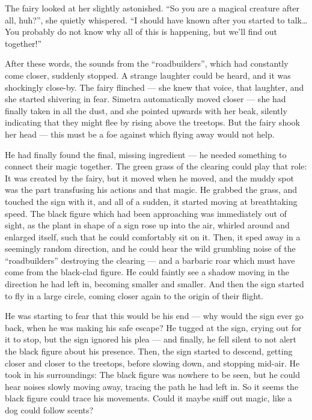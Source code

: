 The fairy looked at her slightly astonished. \enquote{So you are a magical creature after all, huh?}, she quietly whispered. \enquote{I should have known after you started to talk\dots{} You probably do not know why all of this is happening, but we'll find out together!}

After these words, the sounds from the \enquote{roadbuilders}, which had constantly come closer, suddenly stopped. A strange laughter could be heard, and it was shockingly close-by. The fairy flinched --- she knew that voice, that laughter, and she started shivering in fear. Simetra automatically moved closer --- she had finally taken in all the dust, and she pointed upwards with her beak, silently indicating that they might flee by rising above the treetops. But the fairy shook her head --- this must be a foe against which flying away would not help.

\froufrou{}

He had finally found the final, missing ingredient --- he needed something to connect their magic together. The green grass of the clearing could play that role: It was created by the fairy, but it moved when he moved, and the muddy spot was the part transfusing his actions and that magic. He grabbed the grass, and touched the sign with it, and all of a sudden, it started moving at breathtaking speed. The black figure which had been approaching was immediately out of sight, as the plant in shape of a sign rose up into the air, whirled around and enlarged itself, such that he could comfortably sit on it. Then, it sped away in a seemingly random direction, and he could hear the wild grumbling noise of the \enquote{roadbuilders} destroying the clearing --- and a barbaric roar which must have come from the black-clad figure. He could faintly see a shadow moving in the direction he had left in, becoming smaller and smaller. And then the sign started to fly in a large circle, coming closer again to the origin of their flight.

He was starting to fear that this would be his end --- why would the sign ever go back, when he was making his safe escape? He tugged at the sign, crying out for it to stop, but the sign ignored his plea --- and finally, he fell silent to not alert the black figure about his presence. Then, the sign started to descend, getting closer and closer to the treetops, before slowing down, and stopping mid-air. He took in his surroundings: The black figure was nowhere to be seen, but he could hear noises slowly moving away, tracing the path he had left in. So it seems the black figure could trace his movements. Could it maybe sniff out magic, like a dog could follow scents?

